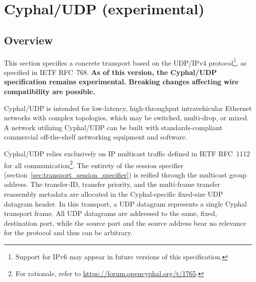 \section{Cyphal/UDP (experimental)}\label{sec:transport_udp}


\subsection{Overview}

This section specifies a concrete transport based on the UDP/IPv4 protocol\footnote{%
    Support for IPv6 may appear in future versions of this specification.
}, as specified in IETF RFC~768.
\textbf{
    As of this version, the Cyphal/UDP specification remains experimental.
    Breaking changes affecting wire compatibility are possible.
}

Cyphal/UDP is intended for low-latency, high-throughput intravehicular Ethernet networks with complex topologies,
which may be switched, multi-drop, or mixed.
A network utilizing Cyphal/UDP can be built with standards-compliant commercial off-the-shelf
networking equipment and software.

Cyphal/UDP relies exclusively on IP multicast traffic defined in IETF RFC~1112 for all communication\footnote{%
    For rationale, refer to \url{https://forum.opencyphal.org/t/1765}.
}.
The entirety of the session specifier (section~\ref{sec:transport_session_specifier})
is reified through the multicast group address.
The transfer-ID, transfer priority, and the multi-frame transfer reassembly metadata are allocated in the
Cyphal-specific fixed-size UDP datagram header.
In this transport, a UDP datagram represents a single Cyphal transport frame.
All UDP datagrams are addressed to the same, fixed, destination port,
while the source port and the source address bear no relevance for the protocol and thus can be arbitrary.

